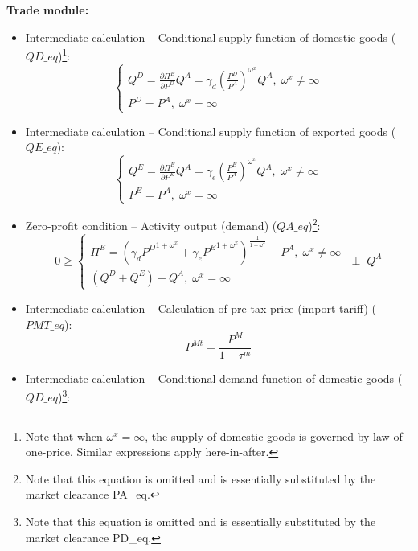 \documentclass[12pt, a4paper]{article}
\numberwithin{equation}{section}
\numberwithin{figure}{section}
\numberwithin{table}{section}
\begin{document}
\textbf{Trade module:}
\begin{itemize}
	\item Intermediate calculation -- Conditional supply function of domestic goods (\(QD\_eq\))\footnote{
	Note that when \(\omega^x=\infty\), the supply of domestic goods is governed by law-of-one-price. 
	Similar expressions apply here-in-after.}: 
	\begin{equation}
		\begin{cases}
		Q^D = \frac{\partial\Pi^E}{\partial P^D}Q^A = \gamma_{d}\left(\frac{P^D}{P^A}\right)^{\omega^{x}}Q^A, \; \omega^x\ne\infty\\
		P^D = P^A, \; \omega^x=\infty
		\end{cases}
	\end{equation}
	\item Intermediate calculation -- Conditional supply function of exported goods (\(QE\_eq\)): 
	\begin{equation}
		\begin{cases}
		Q^E = \frac{\partial\Pi^E}{\partial P^E}Q^A = \gamma_{e}\left(\frac{P^E}{P^A}\right)^{\omega^{x}}Q^A, \; \omega^x\ne\infty\\
		P^E = P^A, \; \omega^x=\infty
		\end{cases}
	\end{equation}
	\item Zero-profit condition -- Activity output (demand) (\(QA\_eq\))\footnote{
	Note that this equation is omitted and is essentially substituted by the market clearance PA\_eq.}: 
	\begin{equation}
		0\geq
		\begin{cases}
		 \Pi^E = \left(\gamma_{d}{P^D}^{1+\omega^x}+\gamma_{e}{P^E}^{1+\omega^x}\right)^{\frac{1}{1+\omega^x}} - P^A,\; \omega^x\ne\infty\\
		 \left(Q^D+Q^E\right) - Q^A,\; \omega^x=\infty
		\end{cases}
		\;\perp\; Q^A
	\end{equation}
	\item Intermediate calculation -- Calculation of pre-tax price (import tariff) (\(PMT\_eq\)): 
	\begin{equation}
		P^{Mt} = \frac{P^M}{1+\tau^m}
	\end{equation}
	\item Intermediate calculation -- Conditional demand function of domestic goods (\(QD\_eq\))\footnote{
	Note that this equation is omitted and is essentially substituted by the market clearance PD\_eq.}: 
	\begin{equation}

\end{equation}
\end{itemize}
\end{document}
